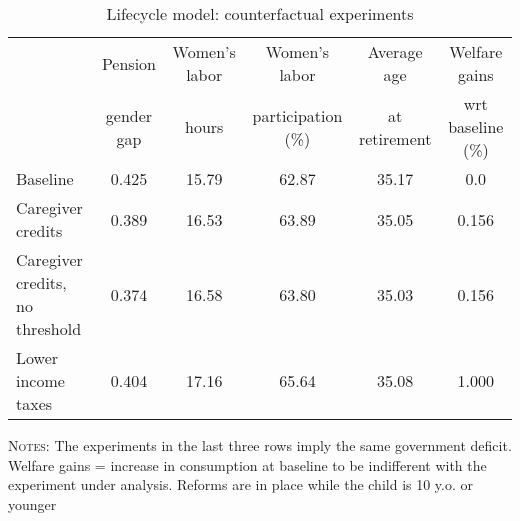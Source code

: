 \begin{table}[htbp]\begin{threeparttable}\caption{Lifecycle model: counterfactual experiments}\label{table:experiments}\centering\footnotesize\begin{tabular}{lccccc} \toprule & Pension & Women's labor & Women's labor & Average age &  Welfare gains  \\&gender gap &hours &  participation  (\%) & at retirement  & wrt baseline (\%)  \\\midrule    Baseline                                   &0.425&15.79&62.87&35.17& 0.0\\ Caregiver credits                          &0.389&16.53&63.89&35.05&0.156\\ Caregiver credits, no threshold            &0.374&16.58&63.80&35.03&0.156\\ Lower income taxes                         &0.404&17.16&65.64&35.08&1.000\\ \bottomrule\end{tabular}\begin{tablenotes}[flushleft]\small\item \textsc{Notes:} The experiments in the last three rows imply the same government deficit. Welfare gains = increase in consumption at baseline to be indifferent with the experiment under analysis. Reforms are in place while the child is 10 y.o. or younger\\\end{tablenotes}\end{threeparttable}\end{table}